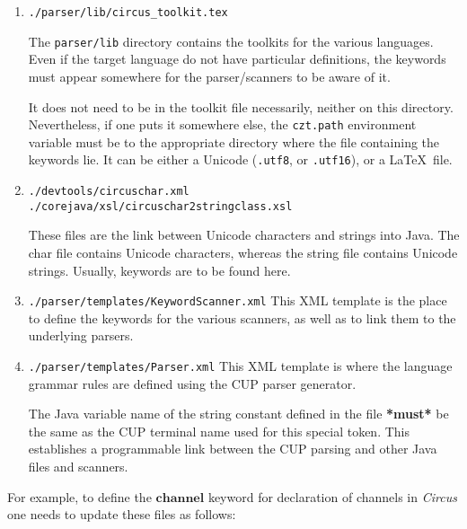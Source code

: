 \documentclass{article}
\newcommand{\Circus}{\textsf{\textit{Circus}}}
\begin{document}
\begin{enumerate}
    \item \texttt{./parser/lib/circus\_toolkit.tex}

        The \texttt{parser/lib} directory contains the toolkits for the various
        languages. Even if the target language do not have particular
        definitions, the keywords must appear somewhere for the parser/scanners
        to be aware of it.

        It does not need to be in the toolkit file necessarily, neither on this directory.
        Nevertheless, if one puts it somewhere else, the \texttt{czt.path}
        environment variable must be to the appropriate directory where the file
        containing the keywords lie. It can be either a Unicode
        (\texttt{.utf8}, or \texttt{.utf16}), or a \LaTeX\ file.

    \item \texttt{./devtools/circuschar.xml} \\
          \texttt{./corejava/xsl/circuschar2stringclass.xsl}

        These files are the link between Unicode characters and strings into Java.
        The char file contains Unicode characters, whereas the string file
        contains Unicode strings. Usually, keywords are to be found here.

    \item \texttt{./parser/templates/KeywordScanner.xml}
        This XML template is the place to define the keywords for the various
        scanners, as well as to link them to the underlying parsers.

    \item \texttt{./parser/templates/Parser.xml}
        This XML template is where the language grammar rules are defined using
        the CUP parser generator.

        The Java variable name of the string constant defined in the
        \texttt{} file \textbf{*must*} be the same as the CUP terminal name used
        for this special token. This establishes a programmable link between the
        CUP parsing and other Java files and scanners.

\end{enumerate}

For example, to define the $\mathbf{channel}$ keyword for declaration of
channels in \Circus\, one needs to update these files as follows:
\end{document}
